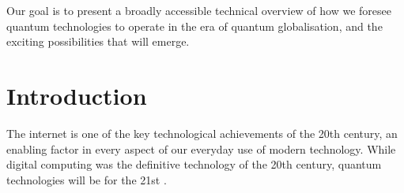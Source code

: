 \documentclass[aps,rmp,twocolumn,amsmath,amssymb,nofootinbib,superscriptaddress,longbibliography,floatfix,table-of-contents,eqsecnum]{revtex4-1}
\begin{document}
Our goal is to present a broadly accessible technical overview of how we foresee quantum technologies to operate in the era of quantum globalisation, and the exciting possibilities that will emerge.

%
%

\section{Introduction} \label{sec:introduction}

The internet is one of the key technological achievements of the 20th century, an enabling factor in every aspect of our everyday use of modern technology. While digital computing was the definitive technology of the 20th century, quantum technologies will be for the 21st \cite{bib:NielsenChuang00, bib:Bennett00}. 
\end{document}

